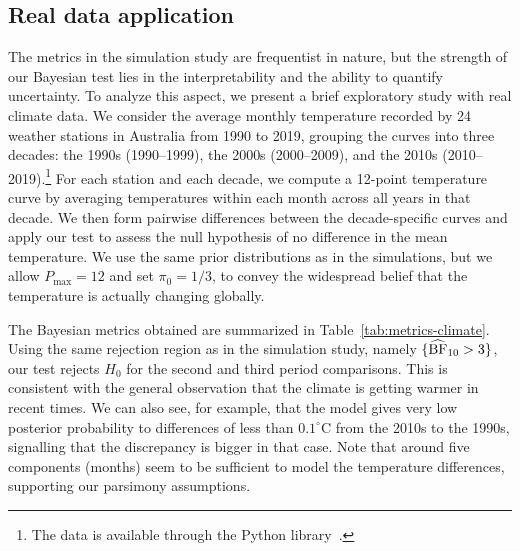 \subsection{Real data application}

The metrics in the simulation study are frequentist in nature, but the strength of our Bayesian test lies in the interpretability and the ability to quantify uncertainty. To analyze this aspect, we present a brief exploratory study with real climate data. We consider the average monthly temperature recorded by 24 weather stations in Australia from 1990 to 2019, grouping the curves into three decades: the 1990s (1990--1999), the 2000s (2000--2009), and the 2010s (2010--2019).\footnote{The data is available through the  Python library~\citep{lamprecht2026meteostat}.} For each station and each decade, we compute a 12-point temperature curve by averaging temperatures within each month across all years in that decade. We then form pairwise differences between the decade-specific curves and apply our test to assess the null hypothesis of no difference in the mean temperature. We use the same prior distributions as in the simulations, but we allow \(P_{\max}=12\) and set \(\pi_0=1/3\), to convey the widespread belief that the temperature is actually changing globally.

The Bayesian metrics obtained are summarized in Table~\ref{tab:metrics-climate}. Using the same rejection region as in the simulation study, namely \(\{\widehat{{\operatorname{\text{BF}}}}_{10}>3\}\), our test rejects \(H_0\) for the second and third period comparisons. This is consistent with the general observation that the climate is getting warmer in recent times. We can also see, for example, that the model gives very low posterior probability to differences of less than \(0.1^\circ\mathrm{C}\) from the 2010s to the 1990s, signalling that the discrepancy is bigger in that case. Note that around five components (months) seem to be sufficient to model the temperature differences, supporting our parsimony assumptions.

